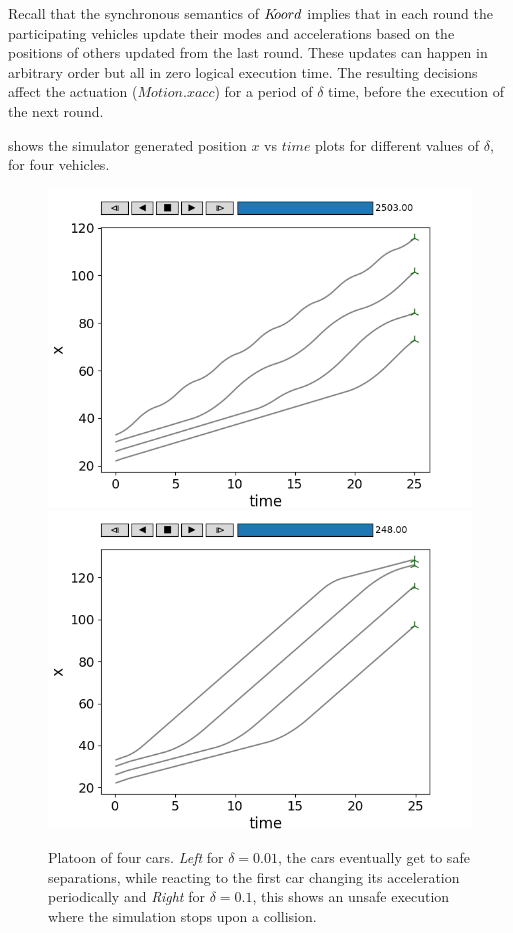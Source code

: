 Recall that the synchronous semantics of $K\kern-2pt oord$ implies that in each round the participating vehicles update their modes and accelerations based on the positions of others updated from the last round. These updates can happen in arbitrary order but all in zero logical execution time. The resulting decisions affect the actuation ($\mathit{Motion.xacc}$) for a period of $\delta$ time, before the execution of the next round. 

 shows the simulator generated position $x$ vs $\mathit{time}$ plots for different values of $\delta$, for four vehicles.

\begin{figure}[ht!]
\begin{minipage}{0.5\textwidth}
\includegraphics[width=.5\textwidth]{figs/braking_acc.png}\hfill
\includegraphics[width=.5\textwidth]{figs/braking_bad.png}
\end{minipage}%
	\caption{\small {Platoon of four cars. \emph{Left} for $\delta = 0.01$, the cars eventually get to safe separations, while reacting to the first car changing its acceleration periodically} and \emph{Right} for $\delta = 0.1$, this shows an unsafe execution where the simulation stops upon a collision.}
\label{fig:platoon}
\end{figure}

